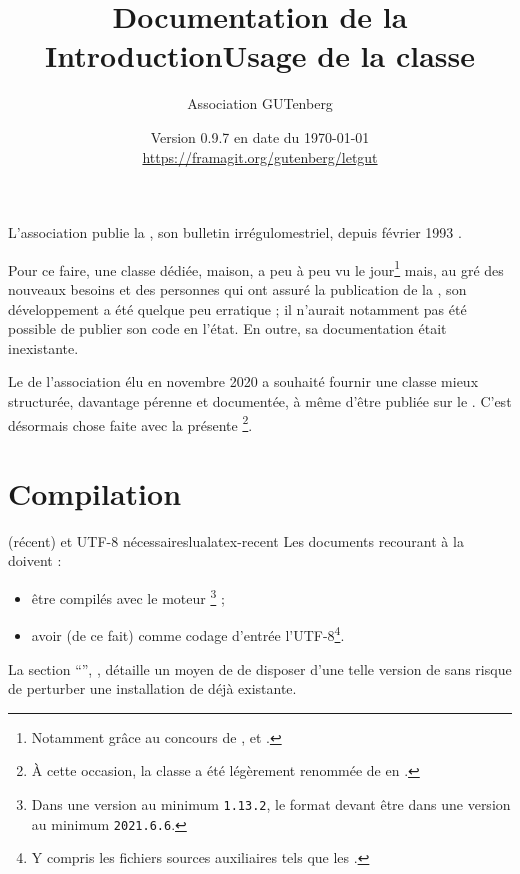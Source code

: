\documentclass{letgut}
\title{%
  Documentation de la
  \texorpdfstring{%
    \letgutcls%
  }{%
    classe letgut%
  }%
}
\author{Association GUTenberg}
\date{%
  Version 0.9.7 en date du \today%
  \texorpdfstring{%
    \\
    \url{https://framagit.org/gutenberg/letgut}%
  }{%
  }%
}
\begin{document}

\title{Introduction}
\label{sec:introduction}
L'association \gutenberg{} publie la , son bulletin irrégulomestriel,
depuis février 1993 \autocite{AssociationGUTenbergLettreGUTenberg}.

Pour ce faire, une classe  dédiée, maison, a peu à peu vu le
jour\footnote{Notamment grâce au concours de ,
   et .} mais, au gré des
nouveaux besoins et des personnes qui ont assuré la publication de la ,
son développement a été quelque peu erratique ; il n'aurait notamment pas été
possible de publier son code en l'état. En outre, sa documentation était
inexistante.

Le \ca{} de l'association élu en novembre 2020 a souhaité fournir une classe
mieux structurée, davantage pérenne et documentée, à même d'être publiée sur le
\ctan{}. C'est désormais chose faite avec la présente \footnote{À
  cette occasion, la classe a été légèrement renommée de  en
  .}.

\title{Usage de la classe }
\label{sec:usage-de-la}

\section{Compilation}
\label{sec:compilation}

\begin{dbwarning}{ (récent) et UTF-8 nécessaires}{lualatex-recent}
  Les documents recourant à la  doivent :
  \begin{itemize}
  \item être compilés avec le moteur \footnote{Dans une version
      au minimum \texttt{1.13.2}, le format  devant être dans
      une version au minimum \texttt{2021.6.6}.} ;
  \item avoir (de ce fait) comme codage d'entrée l'UTF-8\footnote{Y compris les
      fichiers sources auxiliaires tels que les .}.
  \end{itemize}
\end{dbwarning}

La section \enquote{}, ,
détaille un moyen de de disposer d'une telle version de  sans
risque de perturber une installation de  déjà existante.
\end{document}
